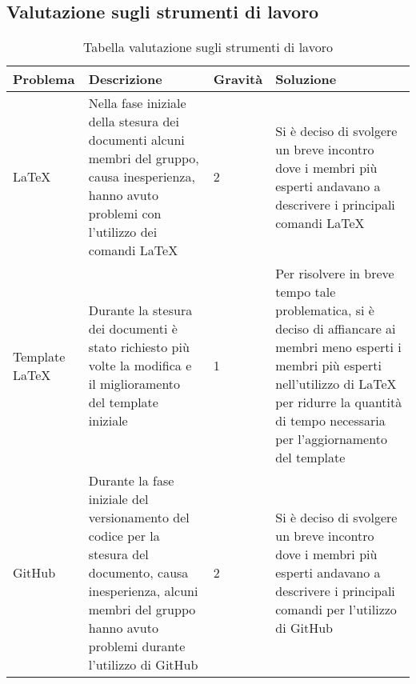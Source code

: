 \subsection{Valutazione sugli strumenti di lavoro}

{

\centering
\renewcommand{\arraystretch}{2}
\begin{longtable}{C{2cm} C{5cm} C{2cm} C{5.2cm}}
\caption{Tabella valutazione sugli strumenti di lavoro}\\
\textbf{Problema} &
\textbf{Descrizione}&
\textbf{Gravità}&
\textbf{Soluzione}\\
\endhead


\LaTeX & Nella fase iniziale della stesura dei documenti alcuni membri del gruppo, causa inesperienza, hanno avuto problemi con l'utilizzo dei comandi \LaTeX{} & 2 & Si è deciso di svolgere un breve incontro dove i membri più esperti andavano a descrivere i principali comandi \LaTeX{} \\
Template \LaTeX & Durante la stesura dei documenti è stato richiesto più volte la modifica e il miglioramento del template iniziale & 1 & Per risolvere in breve tempo tale problematica, si è deciso di affiancare ai membri meno esperti i membri più esperti nell'utilizzo di \LaTeX{} per ridurre la quantità di tempo necessaria per l'aggiornamento del template \\
GitHub & Durante la fase iniziale del versionamento del codice per la stesura del documento, causa inesperienza, alcuni membri del gruppo hanno avuto problemi durante l'utilizzo di GitHub & 2 & Si è deciso di svolgere un breve incontro dove i membri più esperti andavano a descrivere i principali comandi per l'utilizzo di GitHub\\


\end{longtable}
}
